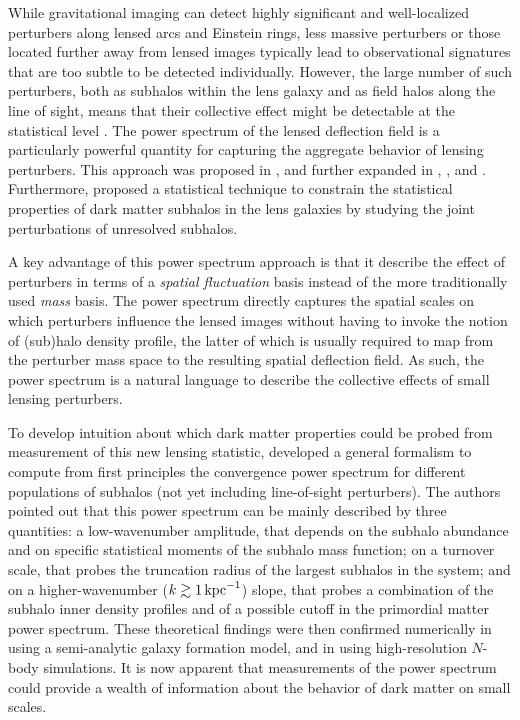 While gravitational imaging can detect highly significant and well-localized perturbers along lensed arcs and Einstein rings, less massive perturbers or those located further away from lensed images typically lead to observational signatures that are too subtle to be detected individually. However, the large number of such perturbers, both as subhalos within the lens galaxy and as field halos along the line of sight, means that their collective effect might be detectable at the statistical level \citep[\eg,][]{Birrer2017}. The power spectrum of the lensed deflection field is a particularly powerful quantity for capturing the aggregate behavior of lensing perturbers. This approach was proposed in \cite{Hezaveh_2014}, and further expanded in \cite{Rivero:2017mao}, \cite{Chatterjee_2017}, and \cite{Cyr-Racine:2018htu}. 
Furthermore, \cite{Daylan:2017kfh} proposed a statistical technique to constrain the statistical properties of dark matter subhalos in the lens galaxies by studying the joint perturbations of unresolved subhalos.

A key advantage of this power spectrum approach is that it describe the effect of perturbers in terms of a \emph{spatial fluctuation} basis instead of the more traditionally used \emph{mass} basis. The power spectrum directly captures the spatial scales on which perturbers influence the lensed images without having to invoke the notion of (sub)halo density profile, the latter of which is usually required to map from the perturber mass space to the resulting spatial deflection field. As such, the power spectrum is a natural language to describe the collective effects of small lensing perturbers. 

To develop intuition about which dark matter properties could be probed from measurement of this new lensing statistic, \cite{Rivero:2017mao} developed a general formalism to compute from first principles the convergence power spectrum for different populations of subhalos (not yet including line-of-sight perturbers). The authors pointed out that this power spectrum can be mainly described by three quantities: a low-wavenumber amplitude, that depends on the subhalo abundance and on specific statistical moments of the subhalo mass function; on a turnover scale, that probes the truncation radius of the largest subhalos in the system; and on a higher-wavenumber ($k\gtrsim 1 \mathrm{\,kpc}^{-1}$) slope, that probes a combination of the subhalo inner density profiles and of a possible cutoff in the primordial matter power spectrum. These theoretical findings were then confirmed numerically in \cite{Brennan:2018jhq} using a semi-analytic galaxy formation model, and in \cite{Rivero:2018bcd} using high-resolution $N$-body simulations. It is now apparent that measurements of the power spectrum could provide a wealth of information about the behavior of dark matter on small scales.

